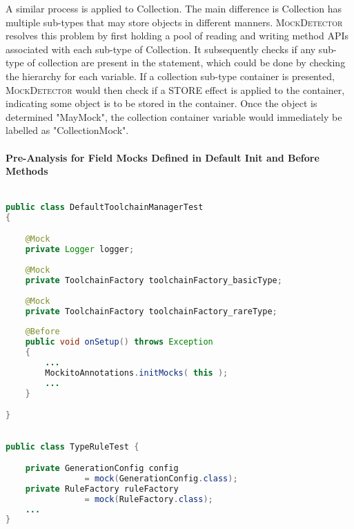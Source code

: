 A similar process is applied to Collection. The main difference is Collection has multiple sub-types that may store objects in different manners. \textsc{MockDetector} resolves this problem by first holding a pool of reading and writing method APIs associated with each sub-type of Collection. It subsequently checks if any sub-type of collection are present in the statement, which could be done by checking the hierarchy for each variable. If a collection sub-type container is presented, \textsc{MockDetector} would then check if a STORE effect is applied to the container, indicating some object is to be stored in the container. Once the object is determined "MayMock", the collection container variable would immediately be labelled as "CollectionMock".\\

\paragraph{Pre-Analysis for Field Mocks Defined in Default Init and Before Methods}
\label{subsubsec:pre-analysis}


\begin{lstlisting}[basicstyle=\ttfamily, caption={Example for Annotated field mocks from \texttt{DefaultToolchainManagerTest.java} in maven-core.},
basicstyle=\scriptsize\ttfamily,language = Java, framesep=4.5mm,
framexleftmargin=1mm, captionpos=b, xleftmargin=3.5ex, label=lis:annotatedMock]

public class DefaultToolchainManagerTest
{

	@Mock
	private Logger logger;
	
	@Mock
	private ToolchainFactory toolchainFactory_basicType;
	
	@Mock
	private ToolchainFactory toolchainFactory_rareType;
	
	@Before
	public void onSetup() throws Exception
	{	
		...
		MockitoAnnotations.initMocks( this );
		...
	}

}

\end{lstlisting}

\begin{lstlisting}[basicstyle=\ttfamily, caption={Example for field mocks defined in <init> from \texttt{TypeRuleTest.java} in jsonschema2pojo.},
basicstyle=\scriptsize\ttfamily,language = Java, framesep=4.5mm,
framexleftmargin=1mm, captionpos=b, xleftmargin=3.5ex, label=lis:fieldMock]

public class TypeRuleTest {

	private GenerationConfig config 
				= mock(GenerationConfig.class);
	private RuleFactory ruleFactory 
				= mock(RuleFactory.class);
	...
}

\end{lstlisting}

